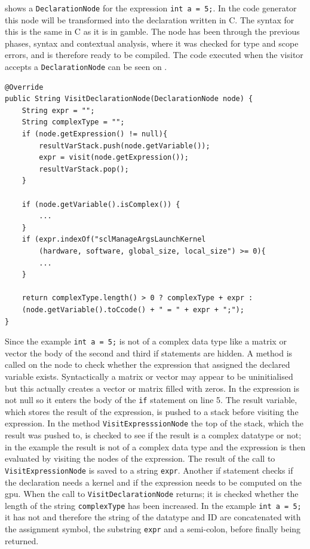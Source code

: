  shows a \texttt{DeclarationNode} for the expression \texttt{int a = 5;}. 
In the code generator this node will be transformed into the declaration written in C. 
The syntax for this is the same in C as it is in \gls{gamble}. 
The node has been through the previous phases, syntax and contextual analysis, where it was checked for type and scope errors, and is therefore ready to be compiled.
The code executed when the visitor accepts a \texttt{DeclarationNode} can be seen on .
\begin{lstlisting}[float, floatplacement=H!, caption=The visit method for visiting a DeclarationNode in the code generator. ,frame=tlrb,label={lst:DeclarationNodeCodeGen}]
@Override
public String VisitDeclarationNode(DeclarationNode node) {
    String expr = "";
    String complexType = "";
    if (node.getExpression() != null){
        resultVarStack.push(node.getVariable());
        expr = visit(node.getExpression());
        resultVarStack.pop();
    }

    if (node.getVariable().isComplex()) {
        ...
    }
    if (expr.indexOf("sclManageArgsLaunchKernel
    	(hardware, software, global_size, local_size") >= 0){
        ...
    }
    
    return complexType.length() > 0 ? complexType + expr : 
    (node.getVariable().toCcode() + " = " + expr + ";");
}
\end{lstlisting}
Since the example \texttt{int a = 5;} is not of a complex data type like a matrix or vector the body of the second and third if statements are hidden.
A method is called on the node to check whether the expression that assigned the declared variable exists. 
Syntactically a matrix or vector may appear to be uninitialised but this actually creates a vector or matrix filled with zeros.
In  the expression is not null so it enters the body of the \texttt{if} statement on line 5.
The result variable, which stores the result of the expression, is pushed to a stack before visiting the expression.
In the method \texttt{VisitExpresssionNode} the top of the stack, which the result was pushed to, is checked to see if the result is a complex datatype or not; in the example the result is not of a complex data type and the expression is then evaluated by visiting the nodes of the expression.
The result of the call to \texttt{VisitExpressionNode} is saved to a string \texttt{expr}.
Another if statement checks if the declaration needs a kernel and if the expression needs to be computed on the \acrshort{gpu}.
When the call to \texttt{VisitDeclarationNode} returns; it is checked whether the length of the string \texttt{complexType} has been increased.
In the example \texttt{int a = 5;} it has not and therefore the string of the datatype and ID are concatenated with the assignment symbol, the substring \texttt{expr} and a semi-colon, before finally being returned.
